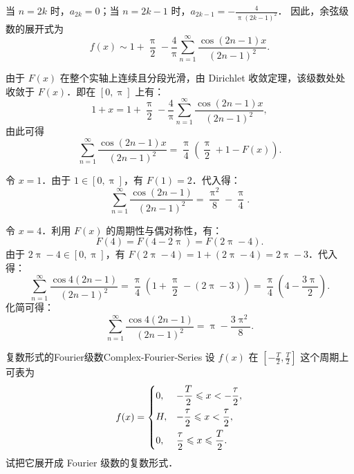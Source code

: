 \begin{solution}
    当 $n = 2k$ 时，$a_{2k} = 0$；当 $n = 2k-1$ 时，$a_{2k-1} = -\frac{4}{\uppi (2k-1)^2}$．
    因此，余弦级数的展开式为
    \begin{equation}
        \boxed{f(x) \sim 1 + \frac{\uppi}{2} - \frac{4}{\uppi} \sum_{n=1}^{\infty} \frac{\cos(2n-1)x}{(2n-1)^2}}.
    \end{equation}

    由于 $F(x)$ 在整个实轴上连续且分段光滑，由 Dirichlet 收敛定理，该级数处处收敛于 $F(x)$．即在 $[0, \uppi]$ 上有：
    \begin{equation}
        1 + x = 1 + \frac{\uppi}{2} - \frac{4}{\uppi} \sum_{n=1}^{\infty} \frac{\cos(2n-1)x}{(2n-1)^2},
    \end{equation}
    由此可得
    \begin{equation}
        \label{eq:sum-formula}
        \sum_{n=1}^{\infty} \frac{\cos(2n-1)x}{(2n-1)^2} = \frac{\uppi}{4} \left( \frac{\uppi}{2} + 1 - F(x) \right).
    \end{equation}


    令 $x=1$．由于 $1 \in [0, \uppi]$，有 $F(1) = 2$．代入得：
    \begin{equation}
        \boxed{\sum_{n=1}^{\infty} \frac{\cos(2n - 1)}{(2n - 1)^2} = \frac{\uppi^2}{8} - \frac{\uppi}{4}}.
    \end{equation}


    令 $x=4$．利用 $F(x)$ 的周期性与偶对称性，有：
    \begin{equation}
        F(4) = F(4 - 2\uppi) = F(2\uppi - 4).
    \end{equation}
    由于 $2\uppi - 4 \in [0, \uppi]$，有 $F(2\uppi - 4) = 1 + (2\uppi - 4) = 2\uppi - 3$．代入得：
    \begin{equation}
        \sum_{n=1}^{\infty} \frac{\cos 4(2n - 1)}{(2n - 1)^2} = \frac{\uppi}{4} \left( 1 + \frac{\uppi}{2} - (2\uppi - 3) \right) = \frac{\uppi}{4} \left( 4 - \frac{3\uppi}{2} \right).
    \end{equation}
    化简可得：
    \begin{equation}
        \boxed{\sum_{n=1}^{\infty} \frac{\cos 4(2n - 1)}{(2n - 1)^2} = \uppi - \frac{3\uppi^2}{8}}.
    \end{equation}
\end{solution}

\begin{problem}{复数形式的Fourier级数}{Complex-Fourier-Series}
    设 $f(x)$ 在 $\left[-\frac{T}{2}, \frac{T}{2}\right]$ 这个周期上可表为
    \begin{equation}
        f(x) = \begin{dcases} 0, & -\frac{T}{2} \leqslant x < -\frac{\tau}{2}, \\ H, & -\frac{\tau}{2} \leqslant x < \frac{\tau}{2}, \\ 0, & \frac{\tau}{2} \leqslant x \leqslant \frac{T}{2}. \end{dcases}
    \end{equation}
    试把它展开成 Fourier 级数的复数形式．
\end{problem}

